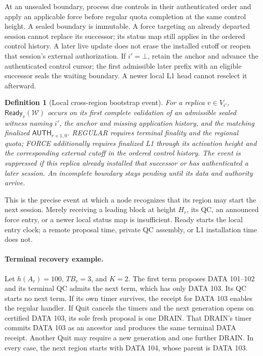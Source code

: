 \documentclass[11pt,a4paper]{article}
\newcommand{\tagg}[1]{\ensuremath{\mathsf{#1}}}
\newtheorem{definition}{Definition}[section]
\begin{document}
At an unsealed boundary, process due controls in their authenticated
order and apply an applicable force before regular quota completion at
the same control height. A sealed boundary is immutable. A force targeting
an already departed session cannot replace its successor; its status map
still applies in the ordered control history. A later live update does
not erase the installed cutoff or reopen that session's external
authorization.
If $i'=\bot$, retain the anchor and advance the authenticated control
cursor; the first admissible later prefix with an eligible successor seals
the waiting boundary. A newer local L1 head cannot reselect it afterward.

\begin{definition}[Local cross-region bootstrap event]
\label{def:bootstrap}
For a replica $v\in V_{i'}$, $\tagg{Ready}_v(\mathcal W)$ occurs on its
first complete validation of an admissible sealed witness naming $i'$,
the anchor and missing application history, and the matching finalized
$\tagg{AUTH}_{r+1,0}$. REGULAR requires terminal finality and the regional
quota; FORCE additionally requires finalized L1 through its activation
height and the corresponding external cutoff in the ordered control history. The event is suppressed if this replica
already installed that successor or has authenticated a later session.
An incomplete boundary stays pending until its data and authority arrive.
\end{definition}
This is the precise event at which a node recognizes that its region may
start the next session. Merely receiving a leading block at height $H_r$,
its QC, an announced force entry, or a newer local status map is insufficient.
Ready starts the local entry clock; a remote proposal time, private QC
assembly, or L1 installation time does not.

\paragraph{Terminal recovery example.}
Let $h(A_r)=100$, $TB_r=3$, and $K=2$. The first term proposes DATA
101--102 and its terminal QC admits the next term, which has only DATA
103. Its QC starts no next term. If its own timer survives, the receipt
for DATA 103 enables the regular handler. If Quit cancels the timers and
the next generation opens on certified DATA 103, its sole fresh proposal
is one DRAIN. That DRAIN's timer commits DATA 103 as an ancestor and
produces the same terminal DATA receipt. Another Quit may require a new
generation and one further DRAIN. In every case, the next region starts
with DATA 104, whose parent is DATA 103.
\end{document}

